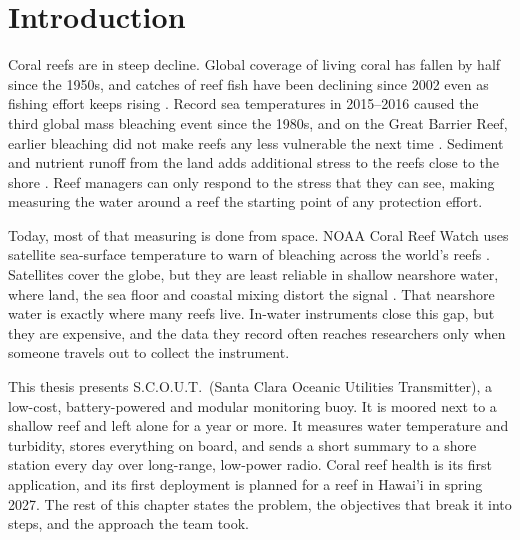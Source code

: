 \chapter{Introduction} %

Coral reefs are in steep decline. Global coverage of living coral has fallen by half since the 1950s, and catches of reef fish have been declining since 2002 even as fishing effort keeps rising \cite{eddy2021}. Record sea temperatures in 2015--2016 caused the third global mass bleaching event since the 1980s, and on the Great Barrier Reef, earlier bleaching did not make reefs any less vulnerable the next time \cite{hughes2017}. Sediment and nutrient runoff from the land adds additional stress to the reefs close to the shore \cite{fabricius2005}. Reef managers can only respond to the stress that they can see, making measuring the water around a reef the starting point of any protection effort.

Today, most of that measuring is done from space. NOAA Coral Reef Watch uses satellite sea-surface temperature to warn of bleaching across the world's reefs \cite{liu2014}. Satellites cover the globe, but they are least reliable in shallow nearshore water, where land, the sea floor and coastal mixing distort the signal \cite{margaritis2025}. That nearshore water is exactly where many reefs live. In-water instruments close this gap, but they are expensive, and the data they record often reaches researchers only when someone travels out to collect the instrument.

This thesis presents S.C.O.U.T.\ (Santa Clara Oceanic Utilities Transmitter), a low-cost, battery-powered and modular monitoring buoy. It is moored next to a shallow reef and left alone for a year or more. It measures water temperature and turbidity, stores everything on board, and sends a short summary to a shore station every day over long-range, low-power radio. Coral reef health is its first application, and its first deployment is planned for a reef in Hawai'i in spring 2027. The rest of this chapter states the problem, the objectives that break it into steps, and the approach the team took.

